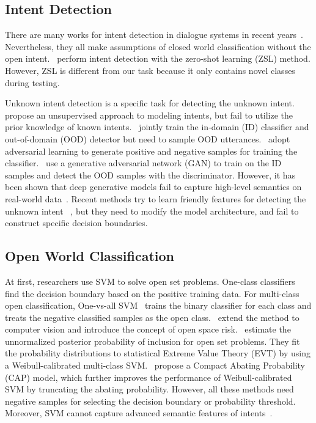\documentclass[letterpaper]{article} %
\begin{document}
	\subsection{Intent Detection}
	There are many works for intent detection in dialogue systems in recent years~\cite{ijcai2020-532,Qin_Che_Li_Ni_Liu_2020,zhang-etal-2019-joint,e-etal-2019-novel,qin-etal-2019-stack}. Nevertheless, they all make assumptions of closed world classification without the open intent.~\citet{srivastava-etal-2018-zero} perform intent detection with the zero-shot learning (ZSL) method. However, ZSL is different from our task because it only contains novel classes during testing.

	Unknown intent detection is a specific task for detecting the unknown intent.~\citet{Brychcin2017UnsupervisedDA} propose an unsupervised approach to modeling intents,  but fail to utilize the prior knowledge of known intents.~\citet{Kim2018JointLO} jointly train the in-domain (ID) classifier and out-of-domain (OOD) detector but need to sample OOD utterances.~\citet{Yu2017OpenCategoryCB} adopt adversarial learning to generate positive and negative samples for training the classifier.~\citet{ryu-etal-2018-domain} use a generative adversarial network (GAN) to train on the ID samples and detect the OOD samples with the discriminator. However, it has been shown that deep generative models fail to capture high-level semantics on real-world data~\cite{2018arXiv181009136N,Mundt_2019_ICCV}. Recent methods try to learn friendly features for detecting the unknown intent ~\cite{lin-xu-2019-deep,gangal2020likelihood,yan-etal-2020-unknown}, but they need to modify the  model architecture, and fail to construct specific decision boundaries.

	\subsection{Open World Classification}
	At first, researchers use SVM to solve open set problems. One-class classifiers~\cite{scholkopf2001estimating,SVDD} find the decision boundary based on the positive training data. For multi-class open classification, One-vs-all SVM~\cite{Rifkin2004In} trains the binary classifier for each class and treats the negative classified samples as the open class.~\citet{scheirer2013toward} extend the method to computer vision and introduce the concept of open space risk.~\citet{Jain_2014_ECCV} estimate the unnormalized posterior probability of inclusion for open set problems. They fit the probability distributions to statistical Extreme Value Theory (EVT) by using a Weibull-calibrated multi-class SVM.~\citet{Scheirer_2014_TPAMIb} propose a Compact Abating Probability (CAP) model, which further improves the performance of Weibull-calibrated SVM by truncating the abating probability. However, all these methods need negative samples for selecting the decision boundary or probability threshold. Moreover, SVM cannot capture  advanced semantic features of intents~\cite{lin2019post}.
\end{document}
